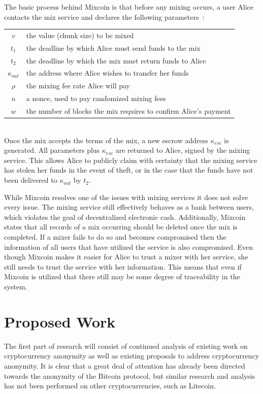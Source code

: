 \documentclass[11pt]{article}
\begin{document}
The basic process behind Mixcoin is that before any mixing occurs, a user Alice
contacts the mix service and declares the following
parameters~\cite{bonneau14}:\\
\begin{tabular}{cl}
    $v$ & the value (chunk size) to be mixed\\
    $t_1$ & the deadline by which Alice must send funds to the mix\\
    $t_2$ & the deadline by which the mix must return funds to Alice\\
    $\kappa_{out}$ & the address where Alice wishes to transfer her funds\\
    $\rho$ & the mixing fee rate Alice will pay\\
    $n$ & a nonce, used to pay randomized mixing fees\\
    $w$ & the number of blocks the mix requires to confirm Alice's payment
\end{tabular}\vspace{1em}\\
Once the mix accepts the terms of the mix, a new escrow address $\kappa_{esc}$
is generated. All parameters plus $\kappa_{esc}$ are returned to Alice, signed
by the mixing service. This allows Alice to publicly claim with certainty that
the mixing service has stolen her funds in the event of theft, or in the case
that the funds have not been delivered to $\kappa_{out}$ by $t_2$.

While Mixcoin resolves one of the issues with mixing services it does not solve
every issue. The mixing service still effectively behaves as a bank between
users, which violates the goal of decentralized electronic cash. Additionally,
Mixcoin states that all records of a mix occurring should be deleted once the
mix is completed. If a mixer fails to do so and becomes compromised then the
information of all users that have utilized the service is also compromised.
Even though Mixcoin makes it easier for Alice to trust a mixer with her service,
she still needs to trust the service with her information. This means that even
if Mixcoin is utilized that there still may be some degree of traceability in
the system.

\section{Proposed Work}
The first part of research will consist of continued analysis of existing
work on cryptocurrency anonymity as well as existing proposals to address
cryptocurrency anonymity. It is clear that a great deal of attention has already
been directed towards the anonymity of the Bitcoin protocol, but similar
research and analysis has not been performed on other cryptocurrencies, such as
Litecoin.
\end{document}
